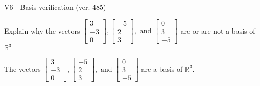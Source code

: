 \begin{exercise}
  \begin{exerciseTitle}V6 - Basis verification (ver. 485)\end{exerciseTitle}
  \begin{exerciseStatement}
    Explain why the vectors \(\left[\begin{array}{r}
3 \\
-3 \\
0
\end{array}\right] , \left[\begin{array}{r}
-5 \\
2 \\
3
\end{array}\right] , \text{ and } \left[\begin{array}{r}
0 \\
3 \\
-5
\end{array}\right]\) are or are not a basis of \(\mathbb{R}^3\)	


  \end{exerciseStatement}
  \begin{exerciseAnswer}
   The vectors \(\left[\begin{array}{r}
3 \\
-3 \\
0
\end{array}\right] , \left[\begin{array}{r}
-5 \\
2 \\
3
\end{array}\right] , \text{ and } \left[\begin{array}{r}
0 \\
3 \\
-5
\end{array}\right]\) 
  	 are  a basis of \(\mathbb{R}^3\).
  


  \end{exerciseAnswer}
\end{exercise}